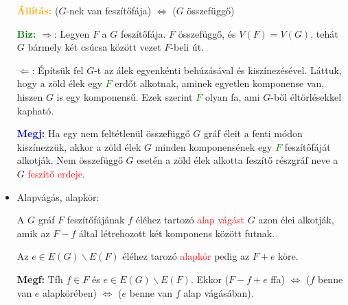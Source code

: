 \documentclass[../../szobeli.tex]{subfiles}
\begin{document}
\begin{itemize}
            \textcolor{orange}{\textbf{Állítás:}} ($G$-nek van feszítőfája) $\Longleftrightarrow$ ($G$ összefüggő)

            \textcolor{green}{\textbf{Biz:}} $\Rightarrow$: Legyen $F$ a $G$ feszítőfája. $F$ összefüggő, és $V(F)=V(G)$, tehát $G$ bármely két csúcsa között vezet $F$-beli út.

            $\Leftarrow$: Építsük fel $G$-t az álek egyenkénti behúzásával és kiszínezésével. Láttuk, hogy a zöld élek egy \textcolor{green}{$F$} erdőt alkotnak, aminek egyetlen komponense van, hiszen $G$ is egy komponensű. Ezek szerint \textcolor{green}{$F$} olyan fa, ami $G$-ből éltörlésekkel kapható. 

            \textcolor{blue}{\textbf{Megj:}} Ha egy nem feltétlenül összefüggő $G$ gráf éleit a fenti módon kiszínezzük, akkor a zöld élek $G$ minden komponensének egy \textcolor{green}{$F$} feszítőfáját alkotják. Nem összefüggő $G$ esetén a zöld élek alkotta feszítő részgráf neve a $G$ \textcolor{red}{feszítő erdeje}.

        \item Alapvágás, alapkör: 
        
            A $G$ gráf $F$ feszítőfájának $f$ éléhez tartozó \textcolor{red}{alap vágást} $G$ azon élei alkotják, amik az $F-f$ által létrehozott két komponens között futnak. 
            
            Az $e \in E(G) \backslash E(F)$ éléhez tarozó \textcolor{red}{alapkör} pedig az $F+e$ köre.  
            
            \textbf{Megf:} Tfh $f \in F$ és $e \in E(G) \backslash E(F)$. Ekkor ($F-f+e$ ffa) $\Longleftrightarrow$ ($f$ benne van $e$ alapkörében) $\Longleftrightarrow$ ($e$ benne van $f$ alap vágásában).
    \end{itemize}
\end{document}
